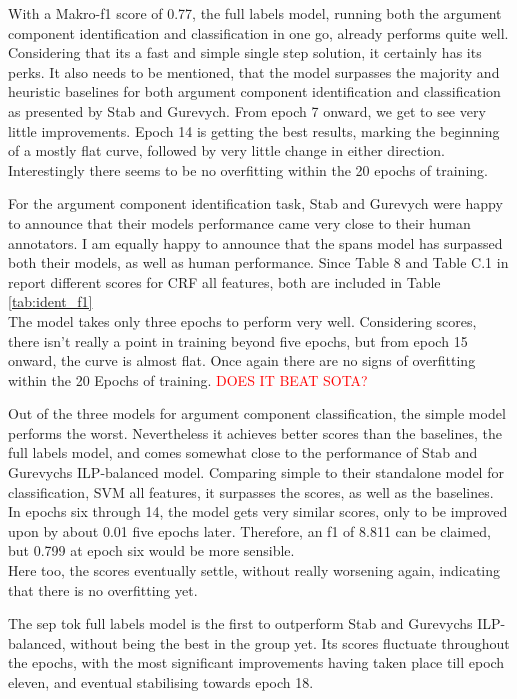 \documentclass[12]{article}
\theoremstyle{mytheoremstyle}
\theoremstyle{mytheoremstyle}
\theoremstyle{myproblemstyle}
\begin{document}
  With a Makro-f1 score of 0.77, the full labels model, running both the argument component identification and classification in one go, already performs quite well. Considering that its a fast and simple single step solution, it certainly has its perks. It also needs to be mentioned, that the model surpasses the majority and heuristic baselines for both argument component identification and classification as presented by Stab and Gurevych.
  From epoch 7 onward, we get to see very little improvements. Epoch 14 is getting the best results, marking the beginning of a mostly flat curve, followed by very little change in either direction. Interestingly there seems to be no overfitting within the 20 epochs of training.

  For the argument component identification task, Stab and Gurevych were happy to announce that their models performance came very close to their human annotators. I am equally happy to announce that the spans model has surpassed both their models, as well as human performance. Since Table 8 and Table C.1 in \cite{stab-gurevych-2017-parsing} report different scores for CRF all features, both are included in Table \ref{tab:ident_f1}\\
  The model takes only three epochs to perform very well. Considering scores, there isn't really a point in training beyond five epochs, but from epoch 15 onward, the curve is almost flat. Once again there are no signs of overfitting within the 20 Epochs of training. \textcolor{red}{DOES IT BEAT SOTA?}

  Out of the three models for argument component classification, the simple model performs the worst. Nevertheless it achieves better scores than the baselines, the full labels model, and comes somewhat close to the performance of Stab and Gurevychs ILP-balanced model. Comparing simple to their standalone model for classification, SVM all features, it surpasses the scores, as well as the baselines.\\
  In epochs six through 14, the model gets very similar scores, only to be improved upon by about 0.01 five epochs later. Therefore, an f1 of 8.811 can be claimed, but 0.799 at epoch six would be more sensible.\\
  Here too, the scores eventually settle, without really worsening again, indicating that there is no overfitting yet.

  The sep tok full labels model is the first to outperform Stab and Gurevychs ILP-balanced, without being the best in the group yet. Its scores fluctuate throughout the epochs, with the most significant improvements having taken place till epoch eleven, and eventual stabilising towards epoch 18.
\end{document}
